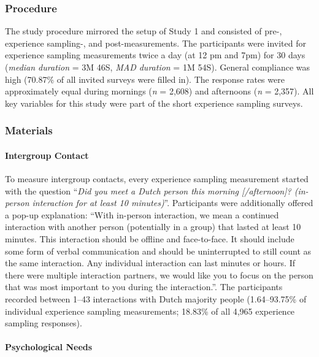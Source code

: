 \subsubsection{Procedure}

The study procedure mirrored the setup of Study 1 and consisted of pre-,
experience sampling-, and post-measurements. The participants were
invited for experience sampling measurements twice a day (at 12 pm and
7pm) for 30 days (\textit{median duration} = 3M 46S,
\textit{MAD duration} = 1M 54S). General compliance was high (70.87\% of
all invited surveys were filled in). The response rates were
approximately equal during mornings (\textit{n} = 2,608) and afternoons
(\textit{n} = 2,357). All key variables for this study were part of the
short experience sampling surveys.

\subsubsection{Materials}

\paragraph{Intergroup Contact}

To measure intergroup contacts, every experience sampling measurement
started with the question
``\textit{Did you meet a Dutch person this morning [/afternoon]? (in-person interaction for at least 10 minutes)}''.
Participants were additionally offered a pop-up explanation: ``With
in-person interaction, we mean a continued interaction with another
person (potentially in a group) that lasted at least 10 minutes. This
interaction should be offline and face-to-face. It should include some
form of verbal communication and should be uninterrupted to still count
as the same interaction. Any individual interaction can last minutes or
hours. If there were multiple interaction partners, we would like you to
focus on the person that was most important to you during the
interaction.''. The participants recorded between 1--43 interactions
with Dutch majority people (1.64--93.75\% of individual experience
sampling measurements; 18.83\% of all 4,965 experience sampling
responses).

\paragraph{Psychological Needs}

